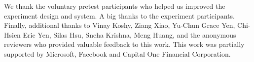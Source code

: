 \begin{acks}
We thank the voluntary pretest participants who helped us improved the experiment design and system. A big thanks to the experiment participants. Finally, additional thanks to Vinay Koshy, Ziang Xiao, Yu-Chun Grace Yen, Chi-Hsien Eric Yen, Silas Hsu, Sneha Krishna, Meng Huang, and the anonymous reviewers who provided valuable feedback to this work. This work was partially supported by Microsoft, Facebook and Capital One Financial Corporation. 
\end{acks}


